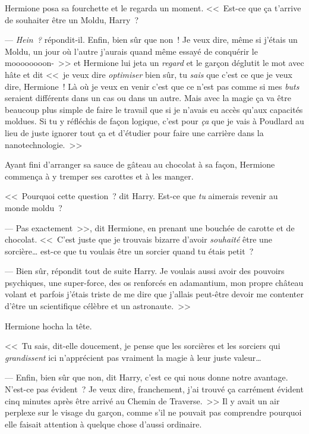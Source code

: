 Hermione posa sa fourchette et le regarda un moment. <<~Est-ce que ça t'arrive de souhaiter être un Moldu, Harry~?

--- \emph{Hein~?} répondit-il. Enfin, bien sûr que non~! Je veux dire, même si j'étais un Moldu, un jour où l'autre j'aurais quand même essayé de conquérir le moooooooon-~>> et Hermione lui jeta un \emph{regard} et le garçon déglutit le mot avec hâte et dit <<~je veux dire \emph{optimiser} bien sûr, tu \emph{sais} que c'est ce que je veux dire, Hermione~! Là où je veux en venir c'est que ce n'est pas comme si mes \emph{buts} seraient différents dans un cas ou dans un autre. Mais avec la magie ça va être beaucoup plus simple de faire le travail que si je n'avais eu accès qu'aux capacités moldues. Si tu y réfléchis de façon logique, c'est pour \emph{ça} que je vais à Poudlard au lieu de juste ignorer tout ça et d'étudier pour faire une carrière dans la nanotechnologie.~>>

Ayant fini d'arranger sa sauce de gâteau au chocolat à sa façon, Hermione commença à y tremper ses carottes et à les manger.

<<~Pourquoi cette question~? dit Harry. Est-ce que \emph{tu} aimerais revenir au monde moldu~?

--- Pas exactement~>>, dit Hermione, en prenant une bouchée de carotte et de chocolat. <<~C'est juste que je trouvais bizarre d'avoir \emph{souhaité} être une sorcière… est-ce que tu voulais être un sorcier quand tu étais petit~?

--- Bien sûr, répondit tout de suite Harry. Je voulais aussi avoir des pouvoirs psychiques, une super-force, des os renforcés en adamantium, mon propre château volant et parfois j'étais triste de me dire que j'allais peut-être devoir me contenter d'être un scientifique célèbre et un astronaute.~>>

Hermione hocha la tête.

<<~Tu sais, dit-elle doucement, je pense que les sorcières et les sorciers qui \emph{grandissent} ici n'apprécient pas vraiment la magie à leur juste valeur…

--- Enfin, bien sûr que non, dit Harry, c'est ce qui nous donne notre avantage. N'est-ce pas évident~? Je veux dire, franchement, j'ai trouvé ça carrément évident cinq minutes après être arrivé au Chemin de Traverse.~>> Il y avait un air perplexe sur le visage du garçon, comme s'il ne pouvait pas comprendre pourquoi elle faisait attention à quelque chose d'aussi ordinaire.
